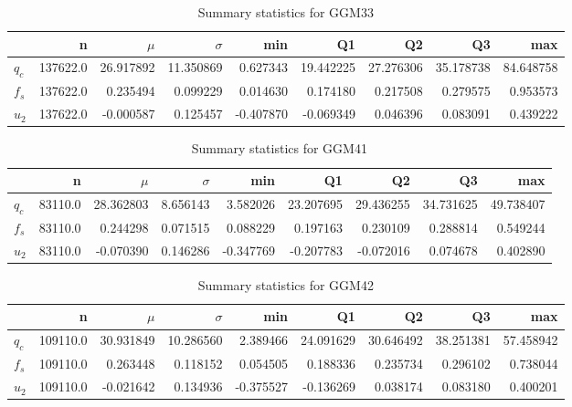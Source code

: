 \begin{table}[h]
\caption{Summary statistics for GGM33}
\begin{tabular}{lrrrrrrrr}
\toprule
{} &         n &      $\mu$ &   $\sigma$ &       min &         Q1 &         Q2 &         Q3 &        max \\
\midrule
$q_c$ &  137622.0 &  26.917892 &  11.350869 &  0.627343 &  19.442225 &  27.276306 &  35.178738 &  84.648758 \\
$f_s$ &  137622.0 &   0.235494 &   0.099229 &  0.014630 &   0.174180 &   0.217508 &   0.279575 &   0.953573 \\
$u_2$ &  137622.0 &  -0.000587 &   0.125457 & -0.407870 &  -0.069349 &   0.046396 &   0.083091 &   0.439222 \\
\bottomrule
\end{tabular}
\end{table}

\begin{table}[h]
\caption{Summary statistics for GGM41}
\begin{tabular}{lrrrrrrrr}
\toprule
{} &        n &      $\mu$ &  $\sigma$ &       min &         Q1 &         Q2 &         Q3 &        max \\
\midrule
$q_c$ &  83110.0 &  28.362803 &  8.656143 &  3.582026 &  23.207695 &  29.436255 &  34.731625 &  49.738407 \\
$f_s$ &  83110.0 &   0.244298 &  0.071515 &  0.088229 &   0.197163 &   0.230109 &   0.288814 &   0.549244 \\
$u_2$ &  83110.0 &  -0.070390 &  0.146286 & -0.347769 &  -0.207783 &  -0.072016 &   0.074678 &   0.402890 \\
\bottomrule
\end{tabular}
\end{table}

\begin{table}[h]
\caption{Summary statistics for GGM42}
\begin{tabular}{lrrrrrrrr}
\toprule
{} &         n &      $\mu$ &   $\sigma$ &       min &         Q1 &         Q2 &         Q3 &        max \\
\midrule
$q_c$ &  109110.0 &  30.931849 &  10.286560 &  2.389466 &  24.091629 &  30.646492 &  38.251381 &  57.458942 \\
$f_s$ &  109110.0 &   0.263448 &   0.118152 &  0.054505 &   0.188336 &   0.235734 &   0.296102 &   0.738044 \\
$u_2$ &  109110.0 &  -0.021642 &   0.134936 & -0.375527 &  -0.136269 &   0.038174 &   0.083180 &   0.400201 \\
\bottomrule
\end{tabular}
\end{table}

